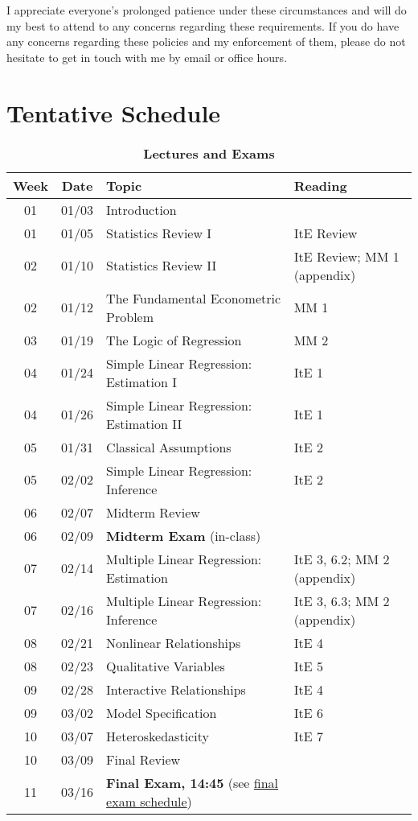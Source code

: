 \documentclass[10pt]{article}
\newcommand{\ra}[1]{\renewcommand{\arraystretch}{#1}}
\begin{document}
\bigskip

\noindent I appreciate everyone's prolonged patience under these circumstances and will do my best to attend to any concerns regarding these requirements.
If you do have any concerns regarding these policies and my enforcement of them, please do not hesitate to get in touch with me by email or office hours. 


\newpage
\section*{Tentative Schedule}

\begin{table}[h!]
	\caption*{\large\textbf{Lectures and Exams}}
	\centering
	\ra{1.5}
	\begin{tabular}{@{\extracolsep{0.5cm}} c c l l @{}}
		\toprule
		\textbf{Week} & \textbf{Date} & \textbf{Topic} & \textbf{Reading}  \\ \toprule
		01 & 01/03 & Introduction & \\
		01 & 01/05 & Statistics Review I & ItE Review \\
		02 & 01/10 & Statistics Review II & ItE Review; MM 1 (appendix) \\
		02 & 01/12 & The Fundamental Econometric Problem & MM 1 \\
		03 & 01/19 & The Logic of Regression & MM 2  \\
		04 & 01/24 & Simple Linear Regression: Estimation I & ItE 1  \\ 
		04 & 01/26 & Simple Linear Regression: Estimation II & ItE 1\\ 
		05 & 01/31 & Classical Assumptions & ItE 2   \\
		05 & 02/02 & Simple Linear Regression: Inference & ItE 2 \\
		06 & 02/07 & Midterm Review & \\ \midrule 
		06 & 02/09 & \textbf{Midterm Exam} (in-class) & \\ \midrule
		07 & 02/14 & Multiple Linear Regression: Estimation & ItE 3, 6.2; MM 2 (appendix) \\
		07 & 02/16 & Multiple Linear Regression: Inference & ItE 3, 6.3; MM 2 (appendix) \\
		08 & 02/21 & Nonlinear Relationships  &  ItE 4  \\ 
		08 & 02/23 & Qualitative Variables & ItE 5 \\ 
		09 & 02/28 & Interactive Relationships & ItE 4  \\
		09 & 03/02 & Model Specification & ItE 6  \\
		10 & 03/07 & Heteroskedasticity &  ItE 7 \\
		10 & 03/09 & Final Review &   \\ \midrule
		11 & 03/16 & \textbf{Final Exam, 14:45} (see \href{https://registrar.uoregon.edu/calendars/examinations#complete-final-exam-schedule}{final exam schedule}) & \\
		\bottomrule
	\end{tabular}
\end{table}
\end{document}
